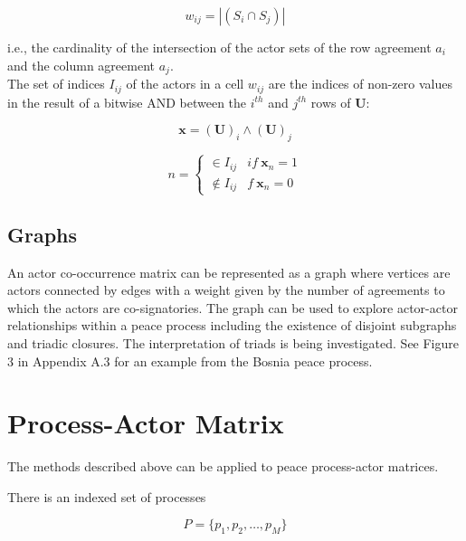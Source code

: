 \documentclass{article}
\begin{document}
\begin{equation}
w_{ij} =  |(S_{i} \cap S_{j}) | 
\end{equation}

i.e., the cardinality of the intersection of the actor sets of the row agreement $a_i$ and the column agreement $a_j$. \\

The set of indices $I_{ij}$ of the actors in a cell $w_{ij}$ are the indices of non-zero values in the result of a bitwise AND between the $i^{th}$ and $j^{th}$ rows of $\bm{U}$:

\begin{equation}
\bm{x} = \bm{(U)}_i \land \bm{(U)} _j
\end{equation}

\begin{equation}
n =
\begin{cases}
\in I_{ij} & if \  \bm{x}_n = 1\\
\notin I_{ij} & f \  \bm{x}_n = 0
\end{cases}
\end{equation}

\subsection{Graphs}

An actor co-occurrence matrix can be represented as a graph where vertices are actors connected by edges with a weight given by the number of agreements to which the actors are co-signatories.  The graph can be used to explore actor-actor relationships within a peace process including the existence of disjoint subgraphs and triadic closures. The interpretation of triads is being investigated. See Figure 3 in Appendix A.3 for an example from the Bosnia peace process. \newline


\section{Process-Actor Matrix}

The methods described above can be applied to peace process-actor matrices.\newline

There is an indexed set of processes 

\begin{equation}
P=\{p_1,p_2,…,p_M\}
\end{equation}
\end{document}
